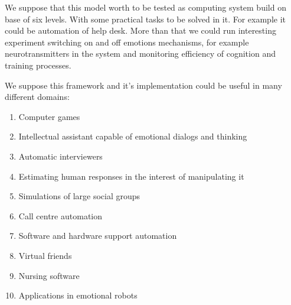 We suppose that this model worth to be tested as computing system build on base of six levels. With some practical tasks to be solved in it. For example it could be automation of help desk. More than that we could run interesting experiment switching on and off emotions mechanisms, for example neurotransmitters in the system and monitoring efficiency of cognition and training processes.

We suppose this framework and it's implementation could be useful in many different domains:

\begin{enumerate}
\item  Computer games
\item  Intellectual assistant capable of emotional dialogs and thinking
\item  Automatic interviewers
\item  Estimating human responses in the interest of manipulating it
\item  Simulations of large social groups
\item  Call centre automation
\item  Software and hardware support automation
\item  Virtual friends
\item  Nursing software
\item  Applications in emotional robots
\end{enumerate}